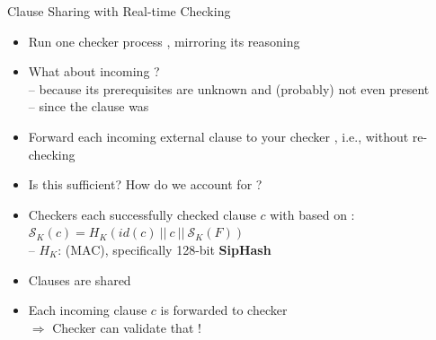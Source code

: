 \documentclass[t,english]{sdqbeamer}
\begin{document}
\begin{frame}{Clause Sharing with Real-time Checking\ \ \cite{schreiber2024trusted}}
\centering
\vspace*{3mm}
\hspace*{-6mm}\begin{minipage}[c][8cm][t]{0.95\textwidth}
	\begin{itemize}
		\item Run one checker process , mirroring its reasoning
		\item What about incoming ?
		\pause
		\\[1mm]--  because its prerequisites are unknown and (probably) not even present
		\\--  since the clause was 
		\pause
		\item[$\Rightarrow$] Forward each incoming external clause to your checker , i.e., without re-checking
		\pause
		\item Is this sufficient?
		\pause
		How do we account for ? {\small {}}
		\pause
		\vspace*{5mm}
		\item Checkers  each successfully checked clause $c$ with  based on
		:\\[1mm]
		$\mathcal{S}_K(c) = H_K(id(c)\ ||\ c\ ||\ \mathcal{S}_K(F))$
		\\-- $H_K$:  (MAC),	specifically 128-bit \textbf{SipHash}~\cite{aumasson2012siphash}
		\item Clauses are shared 
		\item Each incoming clause $c$ is forwarded to checker \\
		$\Rightarrow$ Checker can validate that !
	\end{itemize}
\end{minipage}
\ \ \ 
\begin{minipage}[c][8cm][t]{0.01\textwidth}
	\centering
	\vspace*{0.5cm}
	
	\vspace*{0.5cm}
\end{minipage}%
\end{frame}
\end{document}
